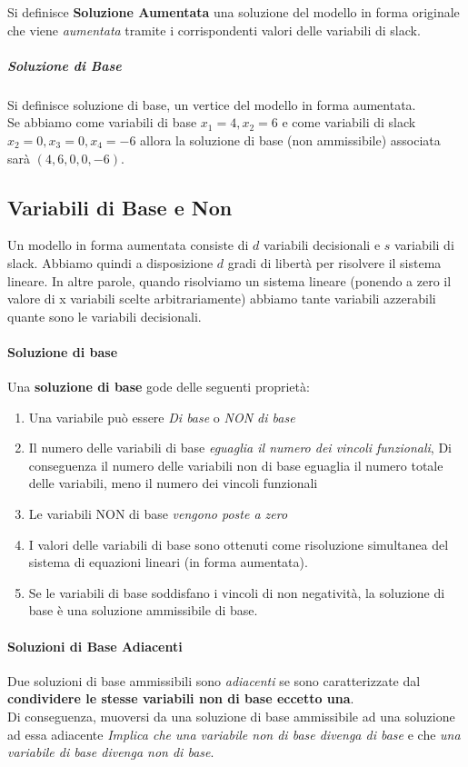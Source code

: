 \documentclass[12pt, a4paper, openany]{book}
\begin{document}
Si definisce \textbf{Soluzione Aumentata} una soluzione del modello in forma originale che viene \emph{aumentata} tramite i
corrispondenti valori delle variabili di slack.
\subparagraph*{Soluzione di Base} 
Si definisce soluzione di base, un vertice del modello in forma aumentata.
\\Se abbiamo come variabili di base $x_1=4,x_2=6$ e come variabili di slack $x_2=0,x_3=0,x_4=-6$ allora la soluzione
di base (non ammissibile) associata sarà $(4,6,0,0,-6)$.
\subsection*{Variabili di Base e Non}
Un modello in forma aumentata consiste di $d$ variabili decisionali e $s$ variabili di slack.
Abbiamo quindi a disposizione $d$ gradi di libertà per risolvere il sistema lineare.
In altre parole, quando risolviamo un sistema lineare (ponendo a zero il valore di x variabili scelte arbitrariamente)
abbiamo tante variabili azzerabili quante sono le variabili decisionali.
\paragraph*{Soluzione di base}
Una \textbf{soluzione di base} gode delle seguenti proprietà:
\begin{enumerate} %
    \item Una variabile può essere \emph{Di base} o \emph{NON di base}
    \item Il numero delle variabili di base \emph{eguaglia il numero dei vincoli funzionali},
    Di conseguenza il numero delle variabili non di base eguaglia il numero totale delle variabili, meno il numero dei vincoli funzionali
    \item Le variabili NON di base \emph{vengono poste a zero}
    \item I valori delle variabili di base sono ottenuti come risoluzione simultanea del sistema di equazioni lineari (in forma aumentata).
    \item Se le variabili di base soddisfano i vincoli di non negatività, la soluzione di base è una soluzione ammissibile di base.
\end{enumerate}
\paragraph{Soluzioni di Base Adiacenti}
Due soluzioni di base ammissibili sono \emph{adiacenti} se sono caratterizzate dal \textbf{condividere le stesse variabili non di base eccetto una}.
\\Di conseguenza, muoversi da una soluzione di base ammissibile ad una soluzione ad essa adiacente 
\emph{Implica che una variabile non di base divenga di base} e che \emph{una variabile di base divenga non di base}.
\end{document}
